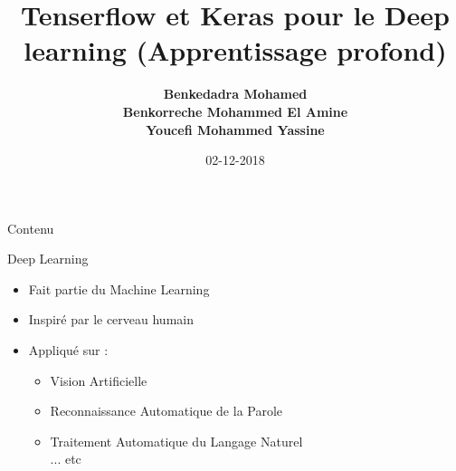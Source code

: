 \documentclass{beamer}
\title{
    \textbf{
        Tenserflow et Keras pour le Deep learning (Apprentissage profond)
    }
}
\date{\scriptsize 02-12-2018}
\author{
    \textbf{Benkedadra Mohamed}\\
    \textbf{Benkorreche Mohammed El Amine}\\
    \textbf{Youcefi Mohammed Yassine}
}
\institute{Universit\'e de Mostaganem}
\begin{document}

    \begin{frame}
        \titlepage \thispagestyle{empty}
    \end{frame}
    
    \begin{frame}{Contenu}
        \tableofcontents
    \end{frame}

    \begin{frame}{Deep Learning}
        \begin{itemize}
            \item Fait partie du Machine Learning
            \item Inspiré par le cerveau humain
            \item Appliqué sur :
            \begin{itemize}
                \item Vision Artificielle
                \item Reconnaissance Automatique de la Parole 
                \item Traitement Automatique du Langage Naturel
                \\... etc
            \end{itemize}
        \end{itemize}
    \end{frame} 
\end{document}
